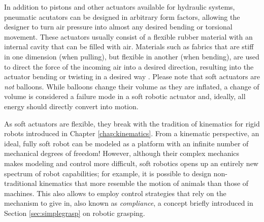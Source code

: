 In addition to pistons and other actuators available for hydraulic systems, pneumatic acutators can be designed in arbitrary form factors, allowing the designer to turn air pressure into almost any desired bending or torsional movement. These actuators usually consist of a flexible rubber material with an internal cavity that can be filled with air. Materials such as fabrics that are stiff in one dimension (when pulling), but flexible in another (when bending), are used to direct the force of the incoming air into a desired direction, resulting into the actuator bending or twisting in a desired way \cite{polygerinos2017soft}. Please note that soft actuators are \textsl{not} balloons. While balloons change their volume as they are inflated, a change of volume is considered a failure mode in a soft robotic actuator and, ideally, all energy should directly convert into motion.

As soft actuators are flexible, they break with the tradition of kinematics for rigid robots introduced in Chapter \ref{chap:kinematics}. From a kinematic perspective, an ideal, fully soft robot can be modeled as a platform with an infinite number of mechanical degrees of freedom!
However, although their complex mechanics makes modeling and control more difficult, soft robotics opens up an entirely new spectrum of robot capabilities; for example, it is possible to design non-traditional kinematics that more resemble the motion of animals than those of machines. This also allows to employ control strategies that rely on the mechanism to give in, also known as \textsl{compliance}, a concept briefly introduced in Section \ref{sec:simplegrasp} on robotic grasping.


